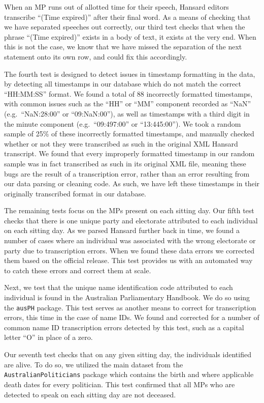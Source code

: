 \documentclass[
  letterpaper,
  DIV=11,
  numbers=noendperiod]{scrartcl}
\begin{document}
When an MP runs out of allotted time for their speech, Hansard editors
transcribe ``(Time expired)'' after their final word. As a means of
checking that we have separated speeches out correctly, our third test
checks that when the phrase ``(Time expired)'' exists in a body of text,
it exists at the very end. When this is not the case, we know that we
have missed the separation of the next statement onto its own row, and
could fix this accordingly.

The fourth test is designed to detect issues in timestamp formatting in
the data, by detecting all timestamps in our database which do not match
the correct ``HH:MM:SS'' format. We found a total of 88 incorrectly
formatted timestamps, with common issues such as the ``HH'' or ``MM''
component recorded as ``NaN'' (e.g.~``NaN:28:00'' or ``09:NaN:00''), as
well as timestamps with a third digit in the minute component
(e.g.~``09:497:00'' or ``13:445:00''). We took a random sample of 25\%
of these incorrectly formatted timestamps, and manually checked whether
or not they were transcribed as such in the original XML Hansard
transcript. We found that every improperly formatted timestamp in our
random sample was in fact transcribed as such in its original XML file,
meaning these bugs are the result of a transcription error, rather than
an error resulting from our data parsing or cleaning code. As such, we
have left these timestamps in their originally transcribed format in our
database.

The remaining tests focus on the MPs present on each sitting day. Our
fifth test checks that there is one unique party and electorate
attributed to each individual on each sitting day. As we parsed Hansard
further back in time, we found a number of cases where an individual was
associated with the wrong electorate or party due to transcription
errors. When we found these data errors we corrected them based on the
official release. This test provides us with an automated way to catch
these errors and correct them at scale.

Next, we test that the unique name identification code attributed to
each individual is found in the Australian Parliamentary Handbook. We do
so using the \texttt{ausPH} package. This test serves as another means
to correct for transcription errors, this time in the case of name IDs.
We found and corrected for a number of common name ID transcription
errors detected by this test, such as a capital letter ``O'' in place of
a zero.

Our seventh test checks that on any given sitting day, the individuals
identified are alive. To do so, we utilized the main dataset from the
\texttt{AustralianPoliticians} package which contains the birth and
where applicable death dates for every politician. This test confirmed
that all MPs who are detected to speak on each sitting day are not
deceased.
\end{document}
